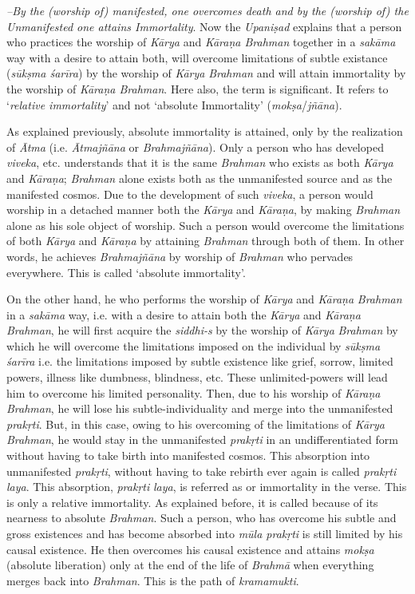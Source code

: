  \emph{--By the (worship of) manifested, one overcomes death and by the (worship of) the Unmanifested one attains Immortality}. Now the \emph{Upaniṣad} explains that a person who practices the worship of \emph{Kārya} and \emph{Kāraṇa Brahman} together in a \emph{sakāma} way with a desire to attain both, will overcome limitations of subtle existance (\emph{sūkṣma śarīra}) by the worship of \emph{Kārya} \emph{Brahman} and will attain immortality by the worship of \emph{Kāraṇa Brahman}. Here also, the term  is significant. It refers to `\emph{relative immortality}' and not `absolute Immortality' (\emph{mokṣa}/\emph{jñāna}).

As explained previously, absolute immortality is attained, only by the realization of \emph{Ātma} (i.e. \emph{Ātmajñāna} or \emph{Brahmajñāna}). Only a person who has developed \emph{viveka}, etc. understands that it is the same \emph{Brahman} who exists as both \emph{Kārya} and \emph{Kāraṇa}; \emph{Brahman} alone exists both as the unmanifested source and as the manifested cosmos. Due to the development of such \emph{viveka}, a person would worship in a detached manner both the \emph{Kārya} and \emph{Kāraṇa}, by making \emph{Brahman} alone as his sole object of worship. Such a person would overcome the limitations of both \emph{Kārya} and \emph{Kāraṇa} by attaining \emph{Brahman} through both of them. In other words, he achieves \emph{Brahmajñāna} by worship of \emph{Brahman} who pervades everywhere. This is called `absolute immortality'.

On the other hand, he who performs the worship of \emph{Kārya} and \emph{Kāraṇa} \emph{Brahman} in a \emph{sakāma} way, i.e. with a desire to attain both the \emph{Kārya} and \emph{Kāraṇa} \emph{Brahman}, he will first acquire the \emph{siddhi-s} by the worship of \emph{Kārya} \emph{Brahman} by which he will overcome the limitations imposed on the individual by \emph{sūkṣma śarīra} i.e. the limitations imposed by subtle existence like grief, sorrow, limited powers, illness like dumbness, blindness, etc. These unlimited-powers will lead him to overcome his limited personality. Then, due to his worship of \emph{Kāraṇa Brahman}, he will lose his subtle-individuality and merge into the unmanifested \emph{prakṛti}. But, in this case, owing to his overcoming of the limitations of \emph{Kārya} \emph{Brahman}, he would stay in the unmanifested \emph{prakṛti} in an undifferentiated form without having to take birth into manifested cosmos. This absorption into unmanifested \emph{prakṛti}, without having to take rebirth ever again is called \emph{prakṛti} \emph{laya}. This absorption, \emph{prakṛti} \emph{laya}, is referred as  or immortality in the verse. This is only a relative immortality. As explained before, it is called  because of its nearness to absolute \emph{Brahman}. Such a person, who has overcome his subtle and gross existences and has become absorbed into \emph{mūla prakṛti} is still limited by his causal existence. He then overcomes his causal existence and attains \emph{mokṣa} (absolute liberation) only at the end of the life of \emph{Brahmā} when everything merges back into \emph{Brahman}. This is the path of \emph{kramamukti}.

